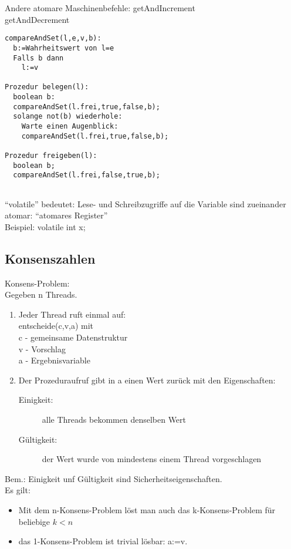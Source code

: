 \documentclass[a4paper,12pt]{scrartcl}
\begin{document}
Andere atomare Maschinenbefehle:
\quad getAndIncrement\\
\quad getAndDecrement\\

\begin{lstlisting}
compareAndSet(l,e,v,b):
  b:=Wahrheitswert von l=e
  Falls b dann
    l:=v
    
Prozedur belegen(l):
  boolean b:
  compareAndSet(l.frei,true,false,b);
  solange not(b) wiederhole:
    Warte einen Augenblick:
    compareAndSet(l.frei,true,false,b);
   
Prozedur freigeben(l):
  boolean b;
  compareAndSet(l.frei,false,true,b);
 
\end{lstlisting}

"`volatile"' bedeutet: Lese- und Schreibzugriffe auf die Variable sind zueinander atomar: "`atomares Register"'\\
Beispiel: volatile int x;

\subsection{Konsenszahlen}

Konsens-Problem:\\
Gegeben n Threads.
\begin{enumerate}
 \item Jeder Thread ruft einmal auf:\\
 entscheide(c,v,a) mit\\
 c - gemeinsame Datenstruktur\\
 v - Vorschlag\\
 a - Ergebnisvariable
 \item Der Prozeduraufruf gibt in a einen Wert zurück mit den Eigenschaften:
 \begin{description}
  \item[Einigkeit:] alle Threads bekommen denselben Wert
  \item[Gültigkeit:] der Wert wurde von mindestens einem Thread vorgeschlagen
 \end{description}

\end{enumerate}

Bem.: Einigkeit unf Gültigkeit sind Sicherheitseigenschaften.\\
Es gilt:
\begin{itemize}
 \item Mit dem n-Konsens-Problem löst man auch das k-Konsens-Problem für beliebige $k<n$
 \item das 1-Konsens-Problem ist trivial lösbar: a:=v.
\end{itemize}
\end{document}

